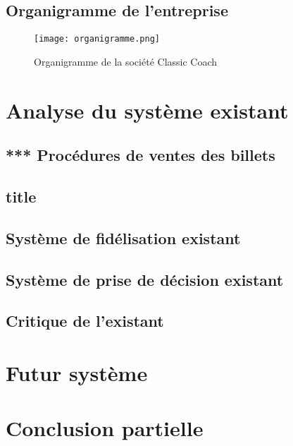        \subsection[Organigramme de l’entreprise]{Organigramme de l’entreprise}
            \begin{figure}[H]
                \centering
                \texttt{[image: organigramme.png]}
                \caption{Organigramme de la société Classic Coach}
                \label{fig:Organigramme}
            \end{figure}
    \section[Analyse du système existant]{Analyse du système existant}
        \subsection[short]{*** Procédures de ventes des billets}
        \subsection[short]{title}
        \subsection[Système de fidélisation existant]{Système de fidélisation existant}
        \subsection[Système de prise de décision existant]{Système de prise de décision existant}
        \subsection[Critique de l’existant]{Critique de l’existant}
    \section[Futur système]{Futur système}
    \section[Conclusion partielle]{Conclusion partielle}